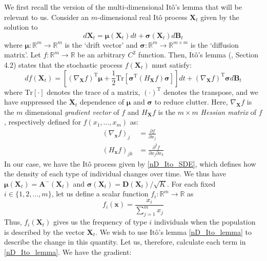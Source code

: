 We first recall the version of the multi-dimensional It\^{o}'s lemma that will be relevant to us. Consider an $m$-dimensional real It\^{o} process $\mathbf{X}_t$ given by the solution to
\begin{equation*}
d\mathbf{X}_t = \boldsymbol{\mu}(\mathbf{X}_t)dt + \boldsymbol{\sigma}(\mathbf{X}_t)d\mathbf{B}_t
\end{equation*}
where $\boldsymbol{\mu}: \mathbb{R}^m \to \mathbb{R}^m$ is the `drift vector' and $\boldsymbol{\sigma}: \mathbb{R}^{m} \to \mathbb{R}^{m \times m}$ is the `diffusion matrix'. Let $f: \mathbb{R}^m \to \mathbb{R}$ be an arbitrary $C^2$ function. Then, It\^{o}'s lemma (\cite{oksendal_stochastic_1998}, Section 4.2) states that  the stochastic process $f(\mathbf{X}_t)$ must satisfy:
\begin{equation}
\label{nD_Ito_lemma}
df(\mathbf{X}_t) = \left[\left(\nabla_{\mathbf{X}}f\right)^{\mathrm{T}}\boldsymbol{\mu} + \frac{1}{2}\mathrm{Tr}[\boldsymbol{\sigma}^{\mathrm{T}}(H_{\mathbf{X}}f)\boldsymbol{\sigma}]\right]dt + \left(\nabla_{\mathbf{X}}f\right)^{\mathrm{T}}\boldsymbol{\sigma}d\mathbf{B}_t
\end{equation}
where $\mathrm{Tr}[\cdot]$ denotes the trace of a matrix, $\left(\cdot\right)^{\mathrm{T}}$ denotes the transpose, and we have suppressed the $\mathbf{X}_t$ dependence of $\boldsymbol{\mu}$ and $\boldsymbol{\sigma}$ to reduce clutter. Here, $\nabla_{\mathbf{X}}f$ is the $m$ dimensional \emph{gradient vector} of $f$ and $H_{\mathbf{X}}f$ is the $m \times m$ \emph{Hessian matrix} of $f$, respectively defined for $f(x_1,\ldots,x_m)$ as:
\begin{align*}
\left(\nabla_{\mathbf{x}} f\right)_j &= \frac{\partial f}{\partial x_j}\\
\left(H_{\mathbf{x}} f\right)_{jk} &= \frac{\partial^2 f}{\partial x_j \partial x_k } 
\end{align*}
In our case, we have the It\^{o} process given by \eqref{nD_Ito_SDE}, which defines how the density of each type of individual changes over time. We thus have $\boldsymbol{\mu}(\mathbf{X}_t) = \mathbf{A}^{-}(\mathbf{X}_t)$ and $\boldsymbol{\sigma}(\mathbf{X}_t) = \mathbf{D}(\mathbf{X}_t)/\sqrt{K}$.  For each fixed $i \in \{1,2,\ldots,m\}$, let us define a scalar function $f_i: \mathbb{R}^m \to \mathbb{R}$ as
\begin{equation*}
f_i(\mathbf{x}) = \frac{x_i}{\sum\limits_{j=1}^{m}x_j}
\end{equation*}
Thus, $f_i(\mathbf{X}_t)$ gives us the frequency of type $i$ individuals when the population is described by the vector $\mathbf{X}_t$. We wish to use It\^{o}'s lemma \eqref{nD_Ito_lemma} to describe the change in this quantity. Let us, therefore, calculate each term in \eqref{nD_Ito_lemma}. We have the gradient:
